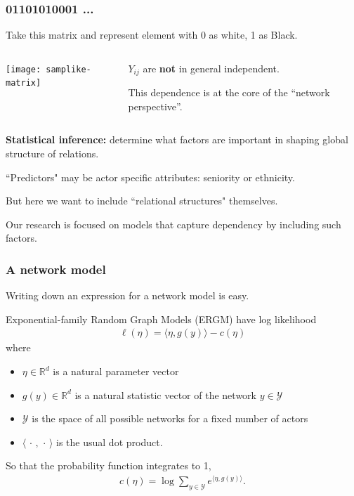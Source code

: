 \documentclass[slidestop,compress, 10pt]{beamer}
\def\RR{{\mathbb R}}
\def\YY{{\mathcal Y}}
\newcommand{\fatdot}{\,\cdot\,}
\newcommand{\inner}[1]{\langle #1 \rangle}
\begin{document}
{
\frametitle{01101010001 ...}
Take this matrix and represent element with 0 as white, 1 as Black.
\pause
\begin{columns}[T]
\begin{column}[T]{0.4\textwidth}
\texttt{[image: samplike-matrix]}
\end{column}
\pause
\begin{column}[T]{0.6\textwidth}
\vspace{5mm}

$Y_{ij}$ are \textbf{not} in general independent.
\vspace{2mm}

This dependence is at the core of the ``network perspective''.
\end{column}
\end{columns}
\vspace{2mm}

\pause
\textbf{Statistical inference:} determine what factors are important in shaping 
global structure of relations.  
\vspace{2mm}

``Predictors" may be actor specific attributes: seniority or ethnicity.

But here we want to include ``relational structures" themselves.
\vspace{2mm}

Our research is focused on models that capture dependency by including such factors.
}

\frame
{
\frametitle{A network model}

Writing down an expression for a network model is easy.  
\vspace{2mm}

Exponential-family Random Graph Models (ERGM) have log likelihood
\begin{align*}%
	\ell( \eta) = \inner{\eta, g(y)} - c(\eta)
\end{align*}
where 
\begin{itemize}
\item $\eta \in \RR^d$ is a natural parameter vector
\item $g(y)\in\RR^d$ is a natural statistic vector of the network $y\in \YY$
\item $\YY$ is the space of all possible networks for a fixed number of actors
\item $\inner{\fatdot,\fatdot}$ is the usual dot product.
\end{itemize}
\vspace{2mm}

So that the probability function integrates to 1,
\begin{align*}
	c(\eta) = \log \sum_{y \in \YY} e^{\inner{\eta, g(y)}}.
\end{align*}
}
\end{document}
